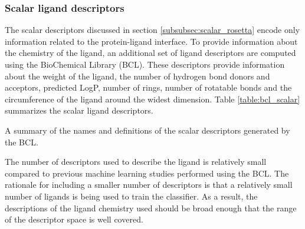\subsubsection{Scalar ligand descriptors}
\label{subsubsec:scalar_bcl}
The scalar descriptors discussed in section \ref{subsubsec:scalar_rosetta} encode only information related to the protein-ligand interface.
To provide information about the chemistry of the ligand, an additional set of ligand descriptors are computed using the BioChemical Library (BCL).
These descriptors provide information about the weight of the ligand, the number of hydrogen bond donors and acceptors, predicted LogP, number of rings, number of rotatable bonds and the circumference of the ligand around the widest dimension.
Table \ref{table:bcl_scalar} summarizes the scalar ligand descriptors.
\begin{table}
\scriptsize
\renewcommand{\tabcolsep}{0.09cm}
\centering

\caption{A summary of the names and definitions of the scalar descriptors generated by the BCL. }
\label{table:bcl_scalar}
\end{table}
The number of descriptors used to describe the ligand is relatively small compared to previous machine learning studies performed using the BCL\citep{Mueller:2010dx}.
The rationale for including a smaller number of descriptors is that a relatively small number of ligands is being used to train the classifier.
As a result, the descriptions of the ligand chemistry used should be broad enough that the range of the descriptor space is well covered.

